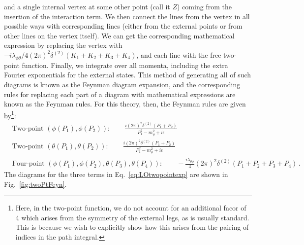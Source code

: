 \documentclass{article}
\numberwithin{equation}{subsection}
\begin{document}
and a single internal vertex at some other point (call it $Z$) coming from the insertion of the interaction term. We then connect the lines from the vertex in all possible ways 
with corresponding lines (either from the external points or from other lines on the vertex itself). We can get the corresponding mathematical expression by replacing the 
vertex with $-i\lambda_{\phi\theta}/4(2\pi)^2\delta^{(2)}(K_1 + K_2 + K_3 + K_4)$, and each line with the free two-point function. Finally, we integrate over all momenta, 
including the extra Fourier exponentials for the external states. This method of generating all of such diagrams is known as the Feynman diagram expansion, and the corresponding 
rules for replacing each part of a diagram with mathematical expressions are known as the Feynman rules. For this
theory, then, the Feynman rules are given by\footnote{Here, in the two-point function, we do not account for an
additional facor of 4 which arises from the symmetry of the external legs, as is usually standard. This is because we
wish to explicitly show how this arises from the pairing of indices in the path integral.}:
\begin{equation}\begin{split}
	&\text{Two-point $(\phi(P_1), \phi(P_2))$}: \qquad \frac{i(2\pi)^2\delta^{(2)}(P_1 + P_2)}{P_1^2 - m_\phi^2 + i\epsilon} \\[0.5em]
	&\text{Two-point $(\theta(P_1), \theta(P_2))$}: \qquad \frac{i(2\pi)^2\delta^{(2)}(P_1 + P_2)}{P_1^2 - m_\phi^2 + i\epsilon} \\[0.5em]
	&\text{Four-point $(\phi(P_1), \phi(P_2), \theta(P_3), \theta(P_4))$}: \qquad
	-\frac{i\lambda_{\theta\phi}}{4}(2\pi)^2\delta^{(2)}(P_1 + P_2 + P_3 + P_4)\,.
\end{split}\end{equation}
The diagrams for the three terms in Eq.~\eqref{eq:LOtwopointexp} are shown in Fig.~\ref{fig:twoPtFeyn}.
\end{document}
